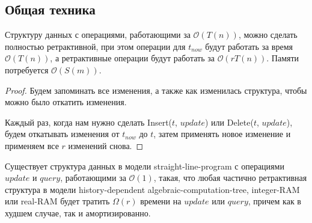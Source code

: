 \subsection*{Общая техника}

\begin{theorem} 

Структуру данных с операциями, работающими за $\mathcal{O}(T(n))$, можно сделать полностью ретрактивной, при этом операции для $t_{now}$ будут работать за время
$\mathcal{O}(T(n))$, а ретрактивные операции будут работать за $\mathcal{O}(rT(n))$. Памяти потребуется $\mathcal{O}(S(m))$.

\end{theorem}

\begin{proof} 

Будем запоминать все изменения, а также как изменилась структура, чтобы можно было откатить изменения.

\vspace{10pt}


Каждый раз, когда нам нужно сделать Insert($t$, $update$) или Delete($t$, $update$), будем откатывать изменения от $t_{now}$ до $t$, затем применять новое изменение и применяем все $r$ изменений снова.
\end{proof}


\begin{theorem} 

Существует структура данных в модели straight-line-program с операциями $update$ и $query$, работающими за $\mathcal{O}(1)$, такая, что любая частично ретрактивная структура в модели history-dependent algebraic-computation-tree, integer-RAM или real-RAM будет тратить $\Omega(r)$ времени на $update$ или $query$, причем как в худшем случае, так и амортизированно.

\end{theorem}

